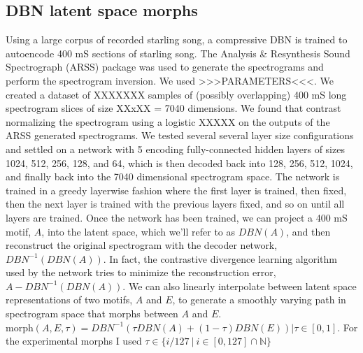 \subsection{\ac{DBN} latent space morphs}
Using a large corpus of recorded starling song, a compressive \ac{DBN} \cite{hinton2006reducing} is trained to autoencode 400 mS sections of starling song. The Analysis \& Resynthesis Sound Spectrograph (ARSS) package was used to generate the spectrograms and perform the spectrogram inversion. We used >>>PARAMETERS<<<. We created a dataset of XXXXXXX samples of (possibly overlapping) 400 mS long spectrogram slices of size XXxXX = 7040 dimensions. We found that contrast normalizing the spectrogram using a logistic XXXXX on the outputs of the ARSS generated spectrograms. We tested several several layer size configurations and settled on a network with 5 encoding fully-connected hidden layers of sizes 1024, 512, 256, 128, and 64, which is then decoded back into 128, 256, 512, 1024, and finally back into the 7040 dimensional spectrogram space. The network is trained in a greedy layerwise fashion where the first layer is trained, then fixed, then the next layer is trained with the previous layers fixed, and so on until all layers are trained. Once the network has been trained, we can project a 400 mS motif, $A$, into the latent space, which we'll refer to as $DBN(A)$, and then reconstruct the original spectrogram with the decoder network, $DBN^{-1}(DBN(A))$. In fact, the contrastive divergence learning algorithm used by the network tries to minimize the reconstruction error, $A - DBN^{-1}(DBN(A))$. We can also linearly interpolate between latent space representations of two motifs, $A$ and $E$, to generate a smoothly varying path in spectrogram space that morphs between $A$ and $E$. $\text{morph}(A, E, \tau) = DBN^{-1}(\tau DBN(A) + (1 - \tau) DBN(E)) | \tau \in [0, 1]$. For the experimental morphs I used $\tau \in \{ i/127\ |\ i \in [0, 127] \cap \mathbb{N}\}$

